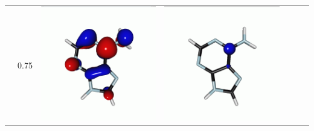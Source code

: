 \documentclass[journal=jctcce,manuscript=article]{achemso}
\begin{document}
\begin{table}[H]
\begin{tabular}{ l| c c c | c c c }
\begin{minipage}{0.2\textwidth}
    \end{minipage}
    & 0.75
    &  \begin{minipage}{0.2\textwidth}
        \centering
        \includegraphics[scale=0.10]{NTO/Adenine_C/5p_C1.png}
    \end{minipage}
    & 
    \begin{minipage}{0.2\textwidth}
        \centering
        \includegraphics[scale=0.10]{NTO/Adenine_C/5h_Cs.png}

\end{minipage}
\end{tabular}
\end{table}
\end{document}
